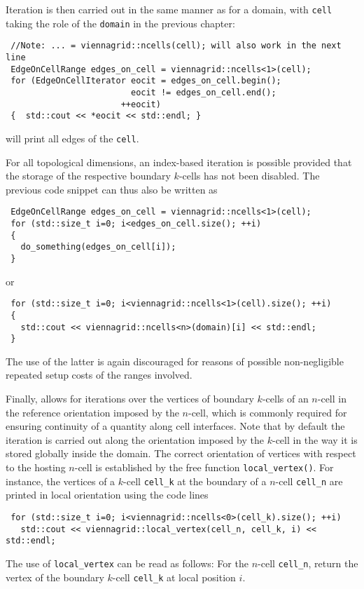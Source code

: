 Iteration is then carried out in the same manner as for a domain, with \lstinline|cell| taking the role of the \lstinline|domain| in the previous chapter:
\begin{lstlisting}
 //Note: ... = viennagrid::ncells(cell); will also work in the next line
 EdgeOnCellRange edges_on_cell = viennagrid::ncells<1>(cell);
 for (EdgeOnCellIterator eocit = edges_on_cell.begin();
                         eocit != edges_on_cell.end();
                       ++eocit)
 {  std::cout << *eocit << std::endl; } 
\end{lstlisting}
will print all edges of the \lstinline|cell|.

For all topological dimensions, an index-based iteration is possible provided that the storage of the respective boundary $k$-cells has not been disabled. The previous code snippet can thus also be written as
\begin{lstlisting}
 EdgeOnCellRange edges_on_cell = viennagrid::ncells<1>(cell);
 for (std::size_t i=0; i<edges_on_cell.size(); ++i)
 { 
   do_something(edges_on_cell[i]);
 }
\end{lstlisting}
or
\begin{lstlisting}
 for (std::size_t i=0; i<viennagrid::ncells<1>(cell).size(); ++i)
 {
   std::cout << viennagrid::ncells<n>(domain)[i] << std::endl;
 }
\end{lstlisting}
The use of the latter is again discouraged for reasons of possible non-negligible repeated setup costs of the ranges involved.


Finally, {\ViennaGrid} allows for iterations over the vertices of boundary $k$-cells of an $n$-cell in the reference orientation imposed by the $n$-cell, which is commonly required for ensuring continuity of a quantity along cell interfaces. Note that by default the iteration is carried out along the orientation imposed by the $k$-cell in the way it is stored globally inside the domain.
The correct orientation of vertices with respect to the hosting $n$-cell is established by the free function \lstinline|local_vertex()|. 
For instance, the vertices of a $k$-cell \lstinline|cell_k| at the boundary of a $n$-cell \lstinline|cell_n| are printed in local orientation using the code lines
\begin{lstlisting}
 for (std::size_t i=0; i<viennagrid::ncells<0>(cell_k).size(); ++i)
   std::cout << viennagrid::local_vertex(cell_n, cell_k, i) << std::endl;
\end{lstlisting}
The use of \lstinline|local_vertex| can be read as follows: For the $n$-cell \lstinline|cell_n|, return the vertex of the boundary $k$-cell \lstinline|cell_k| at local position $i$.

